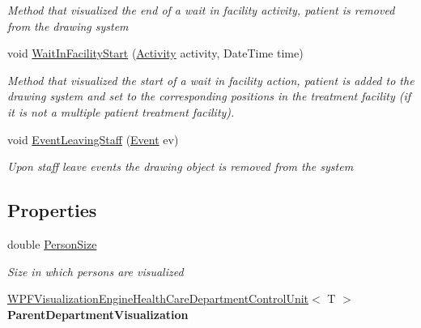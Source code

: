 \begin{DoxyCompactItemize}
\begin{DoxyCompactList}\small\item\em Method that visualized the end of a wait in facility activity, patient is removed from the drawing system \end{DoxyCompactList}\item 
void \hyperlink{class_sample_hospital_model_1_1_visualization_1_1_w_p_f_visualization_health_care_organizational_unit_a3fa4ee2fb4a1cc61b5758cb609b8f1e3}{Wait\+In\+Facility\+Start} (\hyperlink{class_simulation_core_1_1_h_c_c_m_elements_1_1_activity}{Activity} activity, Date\+Time time)
\begin{DoxyCompactList}\small\item\em Method that visualized the start of a wait in facility action, patient is added to the drawing system and set to the corresponding positions in the treatment facility (if it is not a multiple patient treatment facility). \end{DoxyCompactList}\item 
void \hyperlink{class_sample_hospital_model_1_1_visualization_1_1_w_p_f_visualization_health_care_organizational_unit_af5e8e3c0bda42b8381a8f0d2cac97aa1}{Event\+Leaving\+Staff} (\hyperlink{class_simulation_core_1_1_h_c_c_m_elements_1_1_event}{Event} ev)
\begin{DoxyCompactList}\small\item\em Upon staff leave events the drawing object is removed from the system \end{DoxyCompactList}\end{DoxyCompactItemize}
\subsection*{Properties}
\begin{DoxyCompactItemize}
\item 
double \hyperlink{class_sample_hospital_model_1_1_visualization_1_1_w_p_f_visualization_health_care_organizational_unit_adf438c4174f92739e98f5717276878ec}{Person\+Size}
\begin{DoxyCompactList}\small\item\em Size in which persons are visualized \end{DoxyCompactList}\item 
\hyperlink{class_sample_hospital_model_1_1_visualization_1_1_w_p_f_visualization_engine_health_care_department_control_unit}{W\+P\+F\+Visualization\+Engine\+Health\+Care\+Department\+Control\+Unit}$<$ T $>$ {\bfseries Parent\+Department\+Visualization}\hypertarget{class_sample_hospital_model_1_1_visualization_1_1_w_p_f_visualization_health_care_organizational_unit_a6605b7272885d2a4ff425be08da982a0}{}\label{class_sample_hospital_model_1_1_visualization_1_1_w_p_f_visualization_health_care_organizational_unit_a6605b7272885d2a4ff425be08da982a0}

\end{DoxyCompactItemize}
